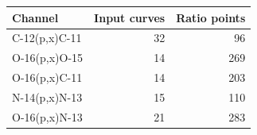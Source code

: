 \begin{tabular}{lrr}
\toprule
Channel & Input curves & Ratio points \\
\midrule
C-12(p,x)C-11 & 32 & 96 \\
O-16(p,x)O-15 & 14 & 269 \\
O-16(p,x)C-11 & 14 & 203 \\
N-14(p,x)N-13 & 15 & 110 \\
O-16(p,x)N-13 & 21 & 283 \\
\bottomrule
\end{tabular}
